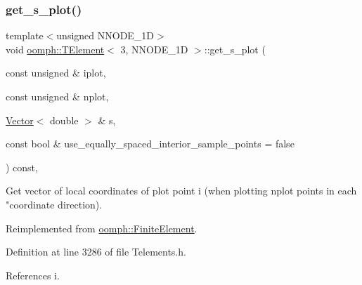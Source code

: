 \subsubsection{\texorpdfstring{get\+\_\+s\+\_\+plot()}{get\_s\_plot()}}
{\footnotesize\ttfamily template$<$unsigned N\+N\+O\+D\+E\+\_\+1D$>$ \\
void \hyperlink{classoomph_1_1TElement}{oomph\+::\+T\+Element}$<$ 3, N\+N\+O\+D\+E\+\_\+1D $>$\+::get\+\_\+s\+\_\+plot (\begin{DoxyParamCaption}\item[{const unsigned \&}]{iplot,  }\item[{const unsigned \&}]{nplot,  }\item[{\hyperlink{classoomph_1_1Vector}{Vector}$<$ double $>$ \&}]{s,  }\item[{const bool \&}]{use\+\_\+equally\+\_\+spaced\+\_\+interior\+\_\+sample\+\_\+points = {\ttfamily false} }\end{DoxyParamCaption}) const\hspace{0.3cm}{\ttfamily [inline]}, {\ttfamily [virtual]}}



Get vector of local coordinates of plot point i (when plotting nplot points in each "coordinate direction). 



Reimplemented from \hyperlink{classoomph_1_1FiniteElement_a82da844fd3ebb2005842464cdc148a03}{oomph\+::\+Finite\+Element}.



Definition at line 3286 of file Telements.\+h.



References i.

\mbox{\label{classoomph_1_1TElement_3_013_00_01NNODE__1D_01_4_ae9abc19e35ca5cc369f8abd3daa87acf}} 
